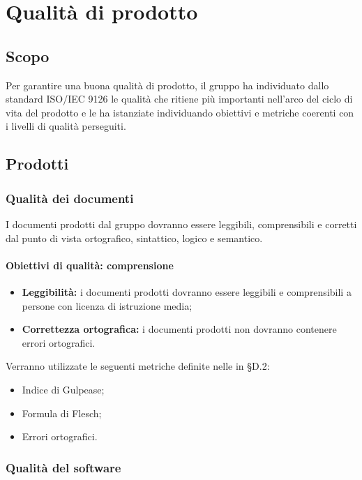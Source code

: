\documentclass[PianoDiQualifica.tex]{subfiles}
\begin{document}
\chapter{Qualità di prodotto}

\section{Scopo}
Per garantire una buona qualità di prodotto, il gruppo \gruppo ha individuato dallo standard ISO/IEC 9126 le qualità che ritiene più importanti nell'arco del ciclo di vita del prodotto e le ha istanziate individuando obiettivi e metriche coerenti con i livelli di qualità perseguiti.

\section{Prodotti}

\subsection{Qualità dei documenti}
I documenti prodotti dal gruppo \gruppo dovranno essere leggibili, comprensibili e corretti dal punto di vista ortografico, sintattico, logico e semantico.
\subsubsection {Obiettivi di qualità: comprensione}
\begin{itemize}
	\item \textbf{Leggibilità:} i documenti prodotti dovranno essere leggibili e comprensibili a persone con licenza di istruzione media;
	\item \textbf{Correttezza ortografica:} i documenti prodotti non dovranno contenere errori ortografici.
\end{itemize}
Verranno utilizzate le seguenti metriche definite nelle \ndp in \S{D.2}:
\begin{itemize}
	\item {} Indice di Gulpease;
	\item {} Formula di Flesch;
	\item {} Errori ortografici.
\end{itemize}

\subsection{Qualità del software}
\end{document}
